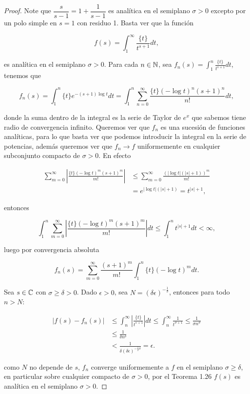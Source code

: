 \begin{proof}
Note que $\dfrac{s}{s-1}=1+\dfrac{1}{s-1}$ es analítica en el semiplano $\sigma>0$ excepto por un polo simple en $s=1$ con residuo 1. Basta ver que la función

$$f(s)=\int_1^{\infty}\frac{\{t\}}{t^{s+1}}dt,$$

es analítica en el semiplano $\sigma>0$. Para cada $n\in \mathbb{N}$, sea $f_n(s)=\displaystyle\int_1^{n}\frac{\{t\}}{t^{s+1}}dt$, tenemos que

$$f_n(s)=\int_1^{n}\{t\}e^{\displaystyle-(s+1)\log t}dt=\int_1^{n}\sum_{n=0}^{\infty}\frac{\{t\}(-\log t)^n(s+1)^n}{n!}dt,$$

donde la suma dentro de la integral es la serie de Taylor de $e^x$ que sabemos tiene radio de convergencia infinito. Queremos ver que $f_n$ es una sucesión de funciones analíticas, para lo que basta ver que podemos introducir la integral en la serie de potencias, además queremos ver que $f_n\to f$ uniformemente en cualquier subconjunto compacto de $\sigma>0$. En efecto

$$\begin{aligned}
\sum_{m=0}^{\infty}\left|\frac{\{t\}(-\log t)^m(s+1)^m}{m!}\right| & \leq \sum_{m=0}^{\infty} \frac{(|\log t|(|s|+1))^m}{m!} \\
& =e^{\displaystyle\left| \log t\right|(|s|+1)}=t^{|s|+1},
\end{aligned}$$

entonces 

$$\int_1^n \sum_{m=0}^{\infty}\left|\frac{\{t\}(-\log t)^m(s+1)^m}{m!}\right| d t \leq \int_1^n t^{|s|+1} d t<\infty,$$

luego por convergencia absoluta

$$f_n(s)=\sum_{m=0}^{\infty} \frac{(s+1)^m}{m!} \int_1^n\{t\}(-\log t)^m d t.$$

Sea $s\in \mathbb{C}$ con $\sigma\geq\delta>0$. Dado $\epsilon>0$, sea $N=(\delta\epsilon)^{-\frac{1}{\delta}}$, entonces para todo $n>N$:

\begin{align*}
\left|f(s)-f_n(s)\right| &\leq \int_n^{\infty} \left|\frac{\{t\}}{t^{s+1}}\right| d t \leq \int_n^{\infty}\frac{1}{t^{\sigma+1}}\leq \frac{1}{\sigma n^\sigma}\\
&\leq \frac{1}{\delta n^\delta}\\
&<\frac{1}{\delta(\delta\epsilon)^{-\frac{1}{\delta}\delta}}=\epsilon.
\end{align*}

como $N$ no depende de $s$, $f_n$ converge uniformemente a $f$ en el semiplano $\sigma\geq\delta$, en particular sobre cualquier compacto de $\sigma>0$, por el Teorema 1.26 $f(s)$ es analítica en el semiplano $\sigma>0$.
\end{proof}

